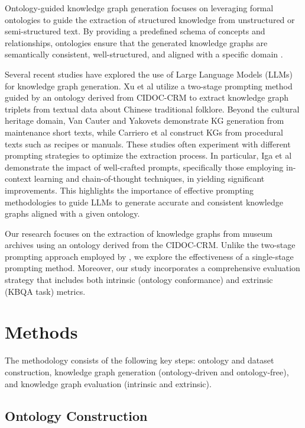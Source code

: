 \documentclass[a4, conference]{IEEEtran}
\begin{document}
Ontology-guided knowledge graph generation focuses on leveraging formal ontologies to guide the extraction of structured knowledge from unstructured or semi-structured text. By providing a predefined schema of concepts and relationships, ontologies ensure that the generated knowledge graphs are semantically consistent, well-structured, and aligned with a specific domain \cite{hofer2024constructionofknowledge}.

Several recent studies have explored the use of Large Language Models (LLMs) for knowledge graph generation. Xu et al \cite{xu2024chattf} utilize a two-stage prompting method guided by an ontology derived from CIDOC-CRM to extract knowledge graph triplets from textual data about Chinese traditional folklore. Beyond the cultural heritage domain, Van Cauter and Yakovets \cite{cauter2024ontology} demonstrate KG generation from maintenance short texts, while Carriero et al \cite{carriero2025humanevaluationofprocedural} construct KGs from procedural texts such as recipes or manuals. These studies often experiment with different prompting strategies to optimize the extraction process. In particular, Iga et al \cite{iga2024assessllm} demonstrate the impact of well-crafted prompts, specifically those employing in-context learning and chain-of-thought techniques, in yielding significant improvements. This highlights the importance of effective prompting methodologies to guide LLMs to generate accurate and consistent knowledge graphs aligned with a given ontology.

Our research focuses on the extraction of knowledge graphs from museum archives using an ontology derived from the CIDOC-CRM. Unlike the two-stage prompting approach employed by \cite{xu2024chattf}, we explore the effectiveness of a single-stage prompting method. Moreover, our study incorporates a comprehensive evaluation strategy that includes both intrinsic (ontology conformance) and extrinsic (KBQA task) metrics.

\section{Methods}

The methodology consists of the following key steps: ontology and dataset construction, knowledge graph generation (ontology-driven and ontology-free), and knowledge graph evaluation (intrinsic and extrinsic).

\subsection{Ontology Construction}
\end{document}
